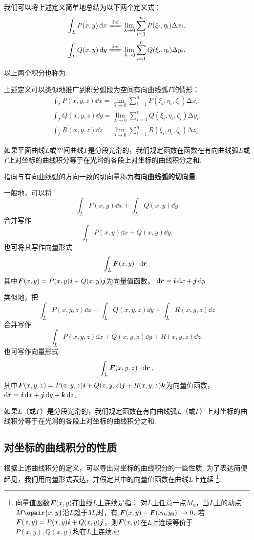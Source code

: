 我们可以将上述定义简单地总结为以下两个定义式：
\[
\int_L P(x,y) \dd{x}
\defeq \lim\limits_{\lambda\to0}
	\sum\limits_{i=1}^n P(\xi_i,\eta_i) \increment x_i.
\]\[
\int_L Q(x,y) \dd{y}
\defeq \lim\limits_{\lambda\to0}
	\sum\limits_{i=1}^n Q(\xi_i,\eta_i) \increment y_i.
\]

以上两个积分也称为.

上述定义可以类似地推广到积分弧段为空间有向曲线弧\(\Gamma\)的情形：
\begingroup
\def\intgamma#1#2{\int_{\Gamma} #1(x,y,z) \dd{#2} = \lim\limits_{\lambda\to0} \sum\limits_{i=1}^n #1(\xi_i,\eta_i,\zeta_i) \increment #2_i}
\begin{gather*}
\intgamma{P}{x}, \\
\intgamma{Q}{y}, \\
\intgamma{R}{z}.
\end{gather*}
\endgroup

如果平面曲线\(L\)或空间曲线\(\Gamma\)是分段光滑的，我们规定函数在函数在有向曲线弧\(L\)或\(\Gamma\)上对坐标的曲线积分等于在光滑的各段上对坐标的曲线积分之和.

指向与有向曲线弧的方向一致的切向量称为\textbf{有向曲线弧的切向量}.

一般地，可以将\[
\int_L P(x,y) \dd{x} + \int_L Q(x,y) \dd{y}
\]合并写作\[
\int_L P(x,y) \dd{x} + Q(x,y) \dd{y}.
\]也可将其写作向量形式\[
\int_L \boldsymbol{F}(x,y) \cdot \dd{\boldsymbol{r}},
\]其中\(\boldsymbol{F}(x,y) = P(x,y) \boldsymbol{i} + Q(x,y) \boldsymbol{j}\)为向量值函数，%
\(\dd{\boldsymbol{r}} = \boldsymbol{i} \dd{x} + \boldsymbol{j} \dd{y}\).

类似地，把\[
\int_L P(x,y,z) \dd{x} + \int_L Q(x,y,z) \dd{y} + \int_L R(x,y,z) \dd{z}
\]合并写作\[
\int_L P(x,y,z) \dd{x} + Q(x,y,z) \dd{y} + R(x,y,z) \dd{z},
\]也可写作向量形式\[
\int_L \boldsymbol{F}(x,y,z) \cdot \dd{\boldsymbol{r}},
\]其中\(\boldsymbol{F}(x,y,z) = P(x,y,z)\boldsymbol{i} + Q(x,y,z)\boldsymbol{j} + R(x,y,z)\boldsymbol{k}\)为向量值函数，%
\(\dd{\boldsymbol{r}} = \boldsymbol{i} \dd{x} + \boldsymbol{j} \dd{y} + \boldsymbol{k} \dd{z}\).

如果\(L\)（或\(\Gamma\)）是分段光滑的，我们规定函数在有向曲线弧\(L\)（或\(\Gamma\)）上对坐标的曲线积分等于在光滑的各段上对坐标的曲线积分之和.

\subsection{对坐标的曲线积分的性质}
根据上述曲线积分的定义，可以导出对坐标的曲线积分的一些性质.
为了表达简便起见，我们用向量形式表达，并假定其中的向量值函数在曲线\(L\)上连续%
\footnote{向量值函数\(\boldsymbol{F}(x,y)\)在曲线\(L\)上连续是指：%
对\(L\)上任意一点\(M_0\)，当\(L\)上的动点\(M\opair{x,y}\)沿\(L\)趋于\(M_0\)时，有\(\abs{\boldsymbol{F}(x,y)-\boldsymbol{F}(x_0,y_0)}\to0\).%
若\(\boldsymbol{F}(x,y)=P(x,y)\boldsymbol{i}+Q(x,y)\boldsymbol{j}\)，则\(\boldsymbol{F}(x,y)\)在\(L\)上连续等价于\(P(x,y),Q(x,y)\)均在\(L\)上连续.}.

